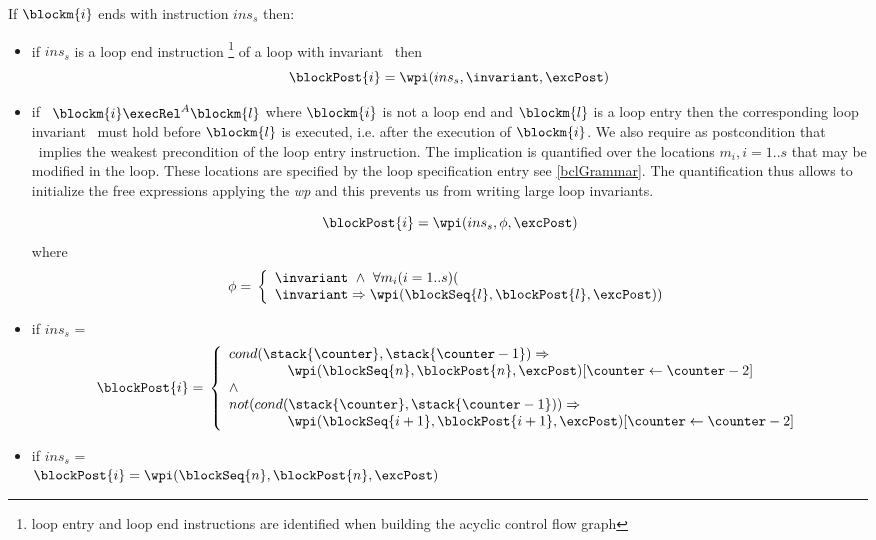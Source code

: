 \begin{defn}\label{post}
 If $\blockm{i}$ ends with instruction $ins_s$ then:
 \begin{itemize} 

\item if  $ins_s$ is a loop end instruction \footnote{loop entry and loop end instructions are identified when building the acyclic control flow graph} of a loop with invariant \invariant \ then 
$$
\blockPost{i} =  \wpi( ins_s, \invariant, \excPost ) 
$$

\item if \ $\blockm{i} \execRel^A \blockm{l}$ where $\blockm{i}$ is not a loop end and  $\blockm{l}$ is a loop entry  then the corresponding loop invariant \invariant \ must hold before $\blockm{l}$ is executed, i.e. after the execution of $\blockm{i}$. We also require as postcondition that \invariant \ implies the weakest precondition of the loop entry instruction. The implication is quantified over the locations $m_i , i= 1..s$ that may be modified in the loop. These locations are specified by the  loop specification entry  see \ref{bclGrammar}. The quantification thus allows to initialize the free expressions applying the \textit{wp} and this prevents us from writing large loop invariants.

$$
\blockPost{i} = \wpi(ins_s, \phi, \excPost) \\
$$
where \\
$$
\phi = \\
\left\{
\begin{array}{l}
\invariant \ \wedge \ \forall m_i (i = 1..s ) (\\
\invariant \Rightarrow \wpi(\blockSeq{l},\blockPost{l},\excPost))
\end{array}
\right.
$$
  
 \item if  $ins_s$ =   \\
$$
\blockPost{i} =  \\
\left\{
\begin{array}{l}
cond( \stack{\counter}, \stack{\counter - 1} )   \Rightarrow \\
\phantom{ \counter }   \wpi(\blockSeq{n}, \blockPost{n} ,\excPost )[ \counter \leftarrow \counter -2 ]  \\
\wedge \\
 not ( cond( \stack{\counter}, \stack{\counter - 1} )  )   \Rightarrow \\
\phantom{ \counter}    \wpi(\blockSeq{i+1}, \blockPost{i+1},\excPost ) [ \counter \leftarrow \counter -2 ]      \\                             
\end{array}
\right.
$$
\item if  $ins_s$ =   \\ 
$\blockPost{i} =  \wpi(\blockSeq{n}, \blockPost{n} , \excPost )$ \\


\end{itemize}
\end{defn}
